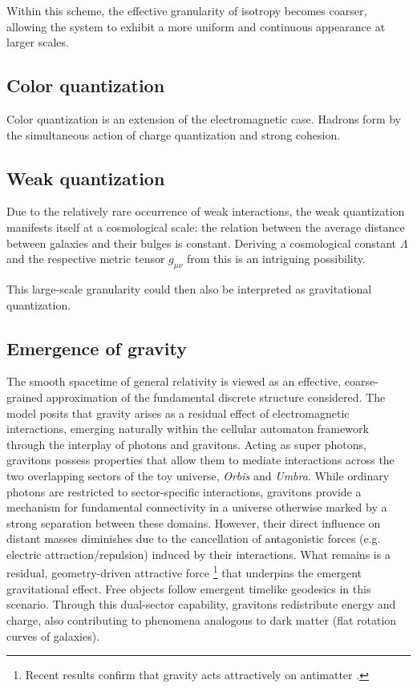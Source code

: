 \documentclass[12pt,english]{article}
\begin{document}
Within this scheme, the effective granularity of isotropy becomes coarser, allowing the system to exhibit a more uniform and continuous appearance at larger scales.

\subsection{Color quantization}
Color quantization is an extension of the electromagnetic case. Hadrons form by the simultaneous action of charge quantization and strong cohesion.

\subsection{Weak quantization}
Due to the relatively rare occurrence of weak interactions, the weak quantization manifests itself at a cosmological scale: the relation between the average distance between galaxies and their bulges is constant. Deriving a cosmological constant $\Lambda$ and the respective metric tensor $g_{\mu\nu}$ from this is an intriguing possibility. 

This large-scale granularity could then also be interpreted as gravitational quantization.

\subsection{Emergence of gravity}\label{subsec:emergence-of-gravity}

 The smooth spacetime of general relativity is viewed as an effective, coarse-grained approximation of the fundamental discrete structure considered. The model posits that gravity arises as a residual effect of electromagnetic interactions, emerging naturally within the cellular automaton framework through the interplay of photons and gravitons. Acting as super photons, gravitons possess properties that allow them to mediate interactions across the two overlapping sectors of the toy universe, \emph{Orbis} and \emph{Umbra}. While ordinary photons are restricted to sector-specific interactions, gravitons provide a mechanism for fundamental connectivity in a universe otherwise marked by a strong separation between these domains. However, their direct influence on distant masses diminishes due to the cancellation of antagonistic forces (e.g. electric attraction/repulsion) induced by their interactions. What remains is a residual, geometry-driven attractive force \footnote{Recent results confirm that gravity acts attractively on antimatter \cite{anderson2023observation}.} that underpins the emergent gravitational effect. Free objects follow emergent timelike geodesics in this scenario. Through this dual-sector capability, gravitons redistribute energy and charge, also contributing to phenomena analogous to dark matter (flat rotation curves of galaxies).
\end{document}
